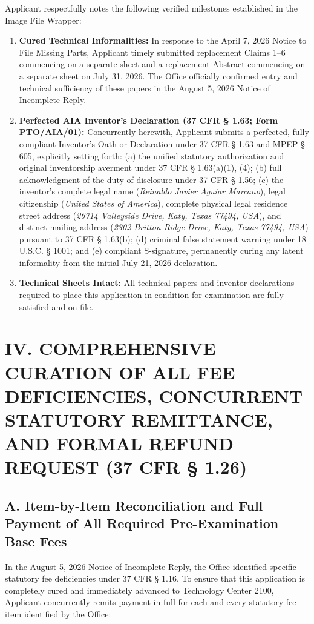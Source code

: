 \documentclass[11pt,letterpaper]{article}
\begin{document}
Applicant respectfully notes the following verified milestones established in the Image File Wrapper:
\begin{enumerate}[leftmargin=*]
    \item \textbf{Cured Technical Informalities:} In response to the April 7, 2026 Notice to File Missing Parts, Applicant timely submitted replacement Claims 1--6 commencing on a separate sheet and a replacement Abstract commencing on a separate sheet on July 31, 2026. The Office officially confirmed entry and technical sufficiency of these papers in the August 5, 2026 Notice of Incomplete Reply.
    \item \textbf{Perfected AIA Inventor's Declaration (37 CFR \S{} 1.63; Form PTO/AIA/01):} Concurrently herewith, Applicant submits a perfected, fully compliant Inventor's Oath or Declaration under 37 CFR \S{} 1.63 and MPEP \S{} 605, explicitly setting forth: (a) the unified statutory authorization and original inventorship averment under 37 CFR \S{} 1.63(a)(1), (4); (b) full acknowledgment of the duty of disclosure under 37 CFR \S{} 1.56; (c) the inventor's complete legal name (\textit{Reinaldo Javier Aguiar Marcano}), legal citizenship (\textit{United States of America}), complete physical legal residence street address (\textit{26714 Valleyside Drive, Katy, Texas 77494, USA}), and distinct mailing address (\textit{2302 Britton Ridge Drive, Katy, Texas 77494, USA}) pursuant to 37 CFR \S{} 1.63(b); (d) criminal false statement warning under 18 U.S.C. \S{} 1001; and (e) compliant S-signature, permanently curing any latent informality from the initial July 21, 2026 declaration.
    \item \textbf{Technical Sheets Intact:} All technical papers and inventor declarations required to place this application in condition for examination are fully satisfied and on file.
\end{enumerate}

\section*{IV. COMPREHENSIVE CURATION OF ALL FEE DEFICIENCIES, CONCURRENT STATUTORY REMITTANCE, AND FORMAL REFUND REQUEST (37 CFR \S{} 1.26)}

\subsection*{A. Item-by-Item Reconciliation and Full Payment of All Required Pre-Examination Base Fees}
In the August 5, 2026 Notice of Incomplete Reply, the Office identified specific statutory fee deficiencies under 37 CFR \S{} 1.16. To ensure that this application is completely cured and immediately advanced to Technology Center 2100, Applicant concurrently remits payment in full for each and every statutory fee item identified by the Office:
\end{document}
